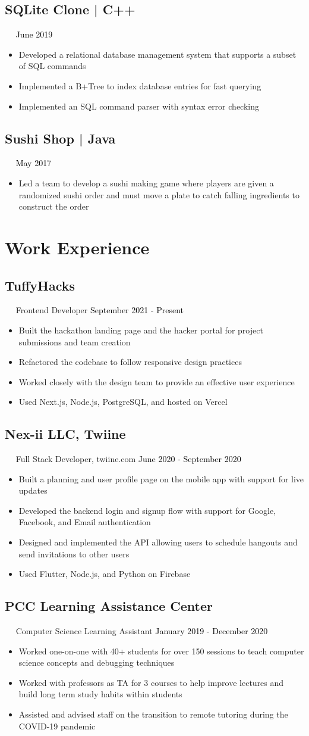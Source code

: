 \documentclass{article}
\newcommand{\resumesection}[3]{
    \subsection*{#1}
    \ 
    \ 
    \small
    \textcolor{csufgrey}{#2}
    \normalsize
    \hfill
    \textcolor{black}{#3}
    \normalsize
}
\begin{document}
\resumesection{SQLite Clone | C++}{}{June 2019}
\begin{itemize}
    \item Developed a relational database management system that supports a subset of SQL commands
    \item Implemented a B+Tree to index database entries for fast querying
    \item Implemented an SQL command parser with syntax error checking
\end{itemize}

\resumesection{Sushi Shop | Java}{}{May 2017}
\begin{itemize}
    \item Led a team to develop a sushi making game where players are given a randomized sushi order and must move a plate to catch falling ingredients to construct the order
\end{itemize}
\hfill
\section*{Work Experience}
\resumesection{TuffyHacks}{Frontend Developer}{September 2021 - Present}
\begin{itemize}
    \item Built the hackathon landing page and the hacker portal for project submissions and team creation
    \item Refactored the codebase to follow responsive design practices
    \item Worked closely with the design team to provide an effective user experience
    \item Used Next.js, Node.js, PostgreSQL, and hosted on Vercel
\end{itemize}
\resumesection{Nex-ii LLC, Twiine}{Full Stack Developer, twiine.com}{June 2020 - September 2020}
\begin{itemize}
    \item Built a planning and user profile page on the mobile app with support for live updates
    \item Developed the backend login and signup flow with support for Google, Facebook, and Email authentication
    \item Designed and implemented the API allowing users to schedule hangouts and send invitations to other users
    \item Used Flutter, Node.js, and Python on Firebase
\end{itemize}
\resumesection{PCC Learning Assistance Center}{Computer Science Learning Assistant}{January 2019 - December 2020}
\begin{itemize}
    \item Worked one-on-one with 40+ students for over 150 sessions to teach computer science concepts and debugging techniques
    \item Worked with professors as TA for 3 courses to help improve lectures and build long term study habits within students
    \item Assisted and advised staff on the transition to remote tutoring during the COVID-19 pandemic
\end{itemize}
\hfill
\end{document}
